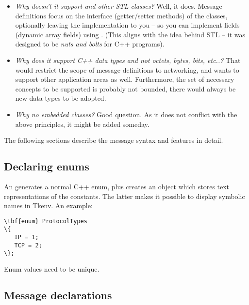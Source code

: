 \begin{itemize}
  \item{\textit{Why doesn't it support  and other STL classes?}
     Well, it does. Message definitions focus on the interface
     (getter/setter methods) of the classes, optionally leaving the implementation
     to you -- so you can implement fields (dynamic array fields)
     using .
     (This aligns with the idea behind STL -- it was designed to be
     \textit{nuts and bolts} for C++ programs).}
  \item{\textit{Why does it support C++ data types and not octets,
     bytes, bits, etc..?}
     That would restrict the scope of message definitions to networking,
     and {\opp} wants to support other application areas as well.
     Furthermore, the set of necessary concepts to be supported is
     probably not bounded, there would always be new data types to
     be adopted.}
  \item{\textit{Why no embedded classes?} Good question. As it does not
     conflict with the above principles, it might be added someday.}
\end{itemize}



The following sections describe the message syntax and features in detail.


\subsection{Declaring enums}

An  generates a normal C++ enum, plus creates an object
which stores text representations of the constants. The latter makes it possible
to display symbolic names in Tkenv.
An example:

\begin{Verbatim}[commandchars=\\\{\}]
\tbf{enum} ProtocolTypes
\{
   IP = 1;
   TCP = 2;
\};
\end{Verbatim}

Enum values need to be unique.


%

\subsection{Message declarations}

